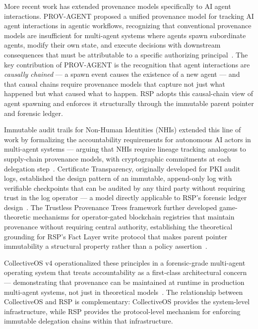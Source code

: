More recent work has extended provenance models specifically to AI agent interactions. PROV-AGENT proposed a unified provenance model for tracking AI agent interactions in agentic workflows, recognizing that conventional provenance models are insufficient for multi-agent systems where agents spawn subordinate agents, modify their own state, and execute decisions with downstream consequences that must be attributable to a specific authorizing principal~\citep{prov-agent2025}. The key contribution of PROV-AGENT is the recognition that agent interactions are \textit{causally chained} — a spawn event causes the existence of a new agent — and that causal chains require provenance models that capture not just what happened but what caused what to happen. RSP adopts this causal-chain view of agent spawning and enforces it structurally through the immutable parent pointer and forensic ledger.

Immutable audit trails for Non-Human Identities (NHIs) extended this line of work by formalizing the accountability requirements for autonomous AI actors in multi-agent systems — arguing that NHIs require lineage tracking analogous to supply-chain provenance models, with cryptographic commitments at each delegation step~\citep{nhi-lineage}. Certificate Transparency, originally developed for PKI audit logs, established the design pattern of an immutable, append-only log with verifiable checkpoints that can be audited by any third party without requiring trust in the log operator — a model directly applicable to RSP's forensic ledger design~\citep{laurie2013certificate}. The Trustless Provenance Trees framework further developed game-theoretic mechanisms for operator-gated blockchain registries that maintain provenance without requiring central authority, establishing the theoretical grounding for RSP's Fact Layer write protocol that makes parent pointer immutability a structural property rather than a policy assertion~\citep{trustless2026}.

CollectiveOS v4 operationalized these principles in a forensic-grade multi-agent operating system that treats accountability as a first-class architectural concern — demonstrating that provenance can be maintained at runtime in production multi-agent systems, not just in theoretical models~\citep{collectiveos}. The relationship between CollectiveOS and RSP is complementary: CollectiveOS provides the system-level infrastructure, while RSP provides the protocol-level mechanism for enforcing immutable delegation chains within that infrastructure.

